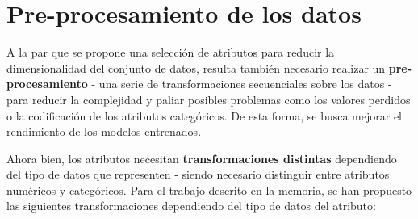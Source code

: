 \section{Pre-procesamiento de los datos}

A la par que se propone una selección de atributos para reducir la dimensionalidad del conjunto de datos, resulta también necesario realizar un \textbf{pre-procesamiento} - una serie de transformaciones secuenciales sobre los datos - para reducir la complejidad y paliar posibles problemas como los valores perdidos o la codificación de los atributos categóricos. De esta forma, se busca mejorar el rendimiento de los modelos entrenados.

Ahora bien, los atributos necesitan \textbf{transformaciones distintas} dependiendo del tipo de datos que representen - siendo necesario distinguir entre atributos numéricos y categóricos. Para el trabajo descrito en la memoria, se han propuesto las siguientes transformaciones dependiendo del tipo de datos del atributo:

